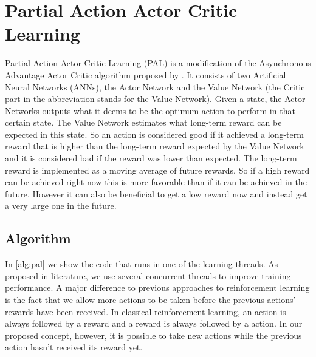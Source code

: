 \documentclass[sigconf]{acmart}
\begin{document}




\maketitle

\section{Partial Action Actor Critic Learning}
\label{sec:pal}

Partial Action Actor Critic Learning (PAL) is a modification of the Asynchronous Advantage Actor Critic algorithm proposed by \citet{mnih_asynchronous_2016}. It consists of two Artificial Neural Networks (ANNs), the Actor Network and the Value Network (the Critic part in the abbreviation stands for the Value Network). Given a state, the Actor Networks outputs what it deems to be the optimum action to perform in that certain state. The Value Network estimates what long-term reward can be expected in this state. So an action is considered good if it achieved a long-term reward that is higher than the long-term reward expected by the Value Network and it is considered bad if the reward was lower than expected. The long-term reward is implemented as a moving average of future rewards. So if a high reward can be achieved right now this is more favorable than if it can be achieved in the future. However it can also be beneficial to get a low reward now and instead get a very large one in the future. 

\subsection{Algorithm}
\label{subsec:alg}

In \autoref{alg:pal} we show the code that runs in one of the learning threads. As proposed in literature, we use several concurrent threads to improve training performance. A major difference to previous approaches to reinforcement learning is the fact that we allow more actions to be taken before the previous actions' rewards have been received. In classical reinforcement learning, an action is always followed by a reward and a reward is always followed by a action. In our proposed concept, however, it is possible to take new actions while the previous action hasn't received its reward yet.
\end{document}
